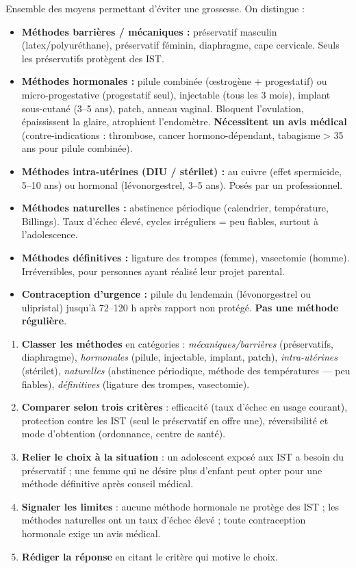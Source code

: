 \documentclass[11pt]{article}
\begin{document}
\begin{definition}[Contraception]
Ensemble des moyens permettant d'éviter une grossesse. On distingue :
\begin{itemize}
\item \textbf{Méthodes barrières / mécaniques :} préservatif masculin (latex/polyuréthane), préservatif féminin, diaphragme, cape cervicale. Seuls les préservatifs protègent des IST.
\item \textbf{Méthodes hormonales :} pilule combinée (œstrogène + progestatif) ou micro-progestative (progestatif seul), injectable (tous les 3 mois), implant sous-cutané (3--5 ans), patch, anneau vaginal. Bloquent l'ovulation, épaississent la glaire, atrophient l'endomètre. \textbf{Nécessitent un avis médical} (contre-indications : thrombose, cancer hormono-dépendant, tabagisme > 35 ans pour pilule combinée).
\item \textbf{Méthodes intra-utérines (DIU / stérilet) :} au cuivre (effet spermicide, 5--10 ans) ou hormonal (lévonorgestrel, 3--5 ans). Posés par un professionnel.
\item \textbf{Méthodes naturelles :} abstinence périodique (calendrier, température, Billings). Taux d'échec élevé, cycles irréguliers = peu fiables, surtout à l'adolescence.
\item \textbf{Méthodes définitives :} ligature des trompes (femme), vasectomie (homme). Irréversibles, pour personnes ayant réalisé leur projet parental.
\item \textbf{Contraception d'urgence :} pilule du lendemain (lévonorgestrel ou ulipristal) jusqu'à 72--120 h après rapport non protégé. \textbf{Pas une méthode régulière}.
\end{itemize}
\end{definition}

\begin{methode}
\begin{enumerate}
\item \textbf{Classer les méthodes} en catégories : \emph{mécaniques/barrières} (préservatifs, diaphragme), \emph{hormonales} (pilule, injectable, implant, patch), \emph{intra-utérines} (stérilet), \emph{naturelles} (abstinence périodique, méthode des températures — peu fiables), \emph{définitives} (ligature des trompes, vasectomie).
\item \textbf{Comparer selon trois critères} : efficacité (taux d'échec en usage courant), protection contre les IST (seul le préservatif en offre une), réversibilité et mode d'obtention (ordonnance, centre de santé).
\item \textbf{Relier le choix à la situation} : un adolescent exposé aux IST a besoin du préservatif ; une femme qui ne désire plus d'enfant peut opter pour une méthode définitive après conseil médical.
\item \textbf{Signaler les limites} : aucune méthode hormonale ne protège des IST ; les méthodes naturelles ont un taux d'échec élevé ; toute contraception hormonale exige un avis médical.
\item \textbf{Rédiger la réponse} en citant le critère qui motive le choix.
\end{enumerate}
\end{methode}
\end{document}
